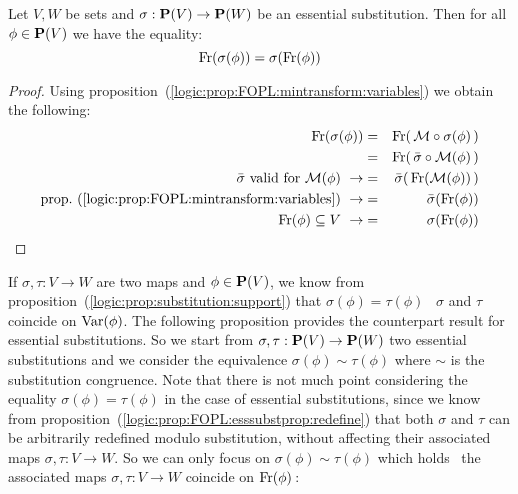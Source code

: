 \begin{prop}\label{logic:prop:FOPL:esssubstprop:free:commute}
Let $V,W$ be sets and $\sigma:\mbox{${\bf P}(V)$}\to{\bf P}(W)$ be an essential
substitution. Then for all $\phi\in\mbox{${\bf P}(V)$}$ we have the equality:
    \[
    \mbox{\rm Fr}(\sigma(\phi))=\sigma(\mbox{\rm Fr}(\phi))
    \]
\end{prop}
\begin{proof}
Using proposition~(\ref{logic:prop:FOPL:mintransform:variables}) we
obtain the following:
    \begin{eqnarray*}
    \free(\sigma(\phi))&=&\free(\,{\cal M}\circ\sigma(\phi)\,)\\
    &=&\free(\,\bar{\sigma}\circ{\cal M}(\phi)\,)\\
    \mbox{$\bar{\sigma}$ valid for ${\cal M}(\phi)$}\ \rightarrow
    &=&\bar{\sigma}(\,\free({\cal M}(\phi))\,)\\
    \mbox{prop.~(\ref{logic:prop:FOPL:mintransform:variables})}\ \rightarrow
    &=&\bar{\sigma}(\free(\phi))\\
    \free(\phi)\subseteq V\ \rightarrow&=&\sigma(\free(\phi))
    \end{eqnarray*}
\end{proof}

If $\sigma,\tau:V\to W$ are two maps and $\phi\in\mbox{${\bf P}(V)$}$, we know from
proposition~(\ref{logic:prop:substitution:support}) that
$\sigma(\phi)=\tau(\phi)$ \ifand\ $\sigma$ and $\tau$ coincide on
$\mbox{\rm Var}(\phi)$. The following proposition provides the counterpart
result for essential substitutions. So we start from
$\sigma,\tau:\mbox{${\bf P}(V)$}\to{\bf P}(W)$ two essential substitutions and we
consider the equivalence $\sigma(\phi)\sim\tau(\phi)$ where $\sim$
is the substitution congruence. Note that there is not much point
considering the equality $\sigma(\phi)=\tau(\phi)$ in the case of
essential substitutions, since we know from
proposition~(\ref{logic:prop:FOPL:esssubstprop:redefine}) that both
$\sigma$ and $\tau$ can be arbitrarily redefined modulo
substitution, without affecting their associated maps
$\sigma,\tau:V\to W$. So we can only focus on
$\sigma(\phi)\sim\tau(\phi)$ which holds \ifand\ the associated maps
$\sigma,\tau:V\to W$ coincide on $\mbox{\rm Fr}(\phi)$\,:

